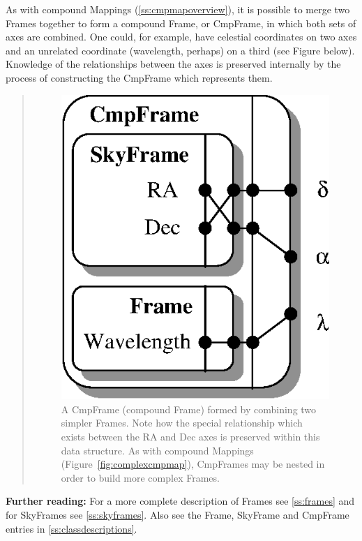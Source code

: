 \documentclass[twoside,11pt]{article}
\newcommand{\appref}[1]{Appendix~\ref{#1}}
\newcommand{\secref}[1]{\S\ref{#1}}
\renewcommand{\appref}[1]{\ref{#1}}
\renewcommand{\secref}[1]{\ref{#1}}
\begin{document}
\begin{htmlonly}
   As with compound Mappings (\secref{ss:cmpmapoverview}), it is possible
   to merge two Frames together to form a compound Frame, or CmpFrame, in
   which both sets of axes are combined.  One could, for example, have
   celestial coordinates on two axes and an unrelated coordinate
   (wavelength, perhaps) on a third (see Figure below).  Knowledge of the
   relationships between the axes is preserved internally by the process
   of constructing the CmpFrame which represents them.
   \begin{quote}
   \begin{figure}
   \label{fig:cmpframe}
   \includegraphics[scale=1.5]{sun210_figures/cmpframe.eps}
   \caption{A CmpFrame (compound Frame) formed by combining two simpler
   Frames. Note how the special relationship which exists between the RA
   and Dec axes is preserved within this data structure. As with compound
   Mappings (Figure~\ref{fig:complexcmpmap}), CmpFrames may be nested in
   order to build more complex Frames.}
   \end{figure}
   \end{quote}
\end{htmlonly}

{\bf{Further reading:}} For a more complete description of Frames see
\secref{ss:frames} and for SkyFrames see \secref{ss:skyframes}.  Also
see the Frame, SkyFrame and CmpFrame entries in
\appref{ss:classdescriptions}.
\end{document}
